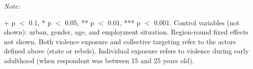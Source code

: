 \begin{table}[!h]
{\begin{threeparttable}
\begin{tabular}[t]{lcccccccc}
\bottomrule
\end{tabular}
\begin{tablenotes}[para]
\item \textit{Note: } 
\item + p $<$ 0.1, * p $<$ 0.05, ** p $<$ 0.01, *** p $<$ 0.001. Control variables (not shown): urban, gender, age, and employment situation. Region-round fixed effects not shown. Both violence exposure and collective targeting refer to the actors defined above (state or rebels). Individual exposure refers to violence during early adulthood (when respondent was between 15 and 25 years old).
\end{tablenotes}
\end{threeparttable}}
\end{table}
